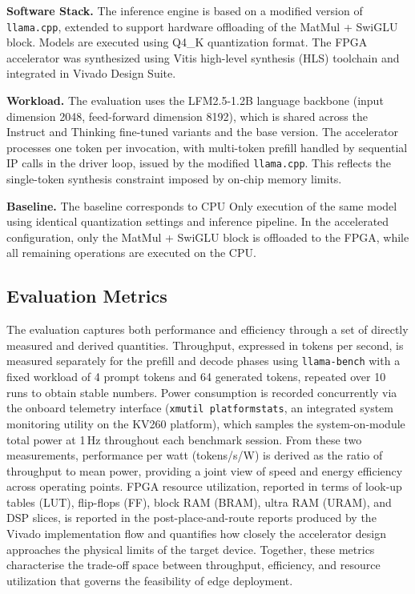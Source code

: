 \documentclass[manuscript,]{acmart} %
\begin{document}
\textbf{Software Stack.} The inference engine is based on a modified version of \texttt{llama.cpp}, extended to support hardware offloading of the MatMul + SwiGLU block. Models are executed using Q4\_K quantization format. The FPGA accelerator was synthesized using Vitis high-level synthesis (HLS) toolchain and integrated in Vivado Design Suite.

\textbf{Workload.} The evaluation uses the LFM2.5-1.2B language backbone (input dimension 2048, feed-forward dimension 8192), which is shared across the Instruct and Thinking fine-tuned variants and the base version. The accelerator processes one token per invocation, with multi-token prefill handled by sequential IP calls in the driver loop, issued by the modified \texttt{llama.cpp}. This reflects the single-token synthesis constraint imposed by on-chip memory limits.

\textbf{Baseline.} The baseline corresponds to CPU Only execution of the same model using identical quantization settings and inference pipeline. In the accelerated configuration, only the MatMul + SwiGLU block is offloaded to the FPGA, while all remaining operations are executed on the CPU.

\subsection{Evaluation Metrics}

The evaluation captures both performance and efficiency through a set of directly
measured and derived quantities.
Throughput, expressed in tokens per second, is measured separately for the prefill
and decode phases using \texttt{llama-bench} with a fixed workload of 4 prompt tokens and
64 generated tokens, repeated over 10 runs to obtain stable numbers.
Power consumption is recorded concurrently via the onboard telemetry interface
(\texttt{xmutil platformstats}, an integrated system monitoring utility on the
KV260 platform), which samples the system-on-module total power at 1\,Hz throughout
each benchmark session.
From these two measurements, performance per watt (tokens/s/W) is derived as the
ratio of throughput to mean power, providing a joint view of speed and energy efficiency
across operating points.
FPGA resource utilization, reported in terms of look-up tables (LUT), flip-flops
(FF), block RAM (BRAM), ultra RAM (URAM), and DSP slices, is reported in the
post-place-and-route reports produced by the Vivado implementation flow and
quantifies how closely the accelerator design approaches the physical limits of the
target device.
Together, these metrics characterise the trade-off space between throughput,
efficiency, and resource utilization that governs the feasibility of edge deployment.
\end{document}
